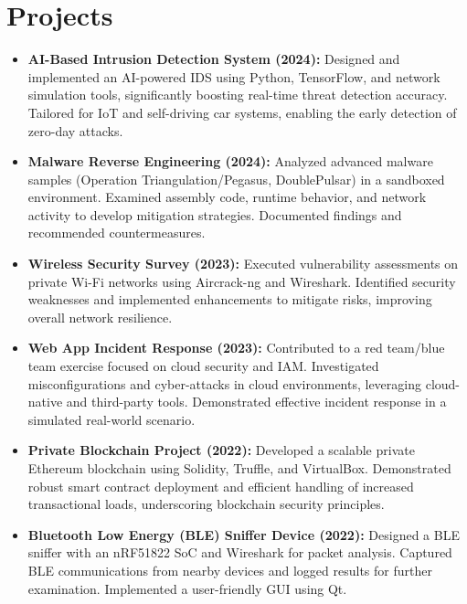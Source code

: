 \documentclass[11pt]{article}
\begin{document}
\section*{Projects}
\begin{itemize}
    \item \textbf{AI-Based Intrusion Detection System (2024):}
        Designed and implemented an AI-powered IDS using Python, TensorFlow, and network simulation tools, significantly boosting real-time threat detection accuracy. Tailored for IoT and self-driving car systems, enabling the early detection of zero-day attacks.

    \item \textbf{Malware Reverse Engineering (2024):}
        Analyzed advanced malware samples (Operation Triangulation/Pegasus, DoublePulsar) in a sandboxed environment. Examined assembly code, runtime behavior, and network activity to develop mitigation strategies. Documented findings and recommended countermeasures.

    \item \textbf{Wireless Security Survey (2023):}
        Executed vulnerability assessments on private Wi-Fi networks using Aircrack-ng and Wireshark. Identified security weaknesses and implemented enhancements to mitigate risks, improving overall network resilience.

    \item \textbf{Web App Incident Response (2023):}
        Contributed to a red team/blue team exercise focused on cloud security and IAM. Investigated misconfigurations and cyber-attacks in cloud environments, leveraging cloud-native and third-party tools. Demonstrated effective incident response in a simulated real-world scenario.

    \item \textbf{Private Blockchain Project (2022):}
        Developed a scalable private Ethereum blockchain using Solidity, Truffle, and VirtualBox. Demonstrated robust smart contract deployment and efficient handling of increased transactional loads, underscoring blockchain security principles.

    \item \textbf{Bluetooth Low Energy (BLE) Sniffer Device (2022):}
        Designed a BLE sniffer with an nRF51822 SoC and Wireshark for packet analysis. Captured BLE communications from nearby devices and logged results for further examination. Implemented a user-friendly GUI using Qt.


\end{itemize}
\end{document}
